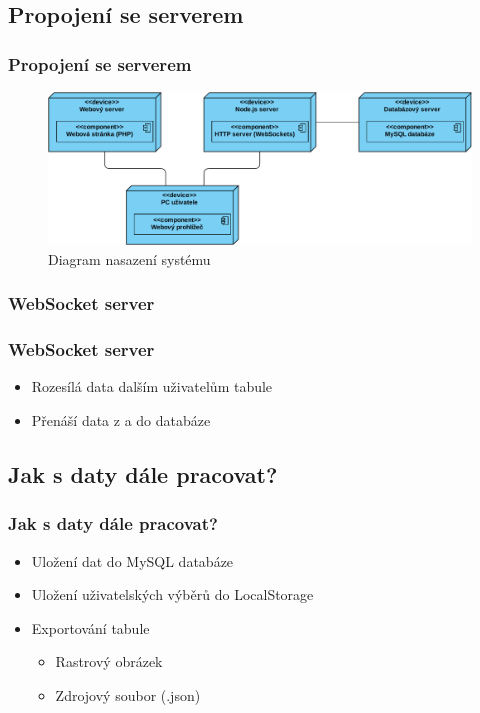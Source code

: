 \documentclass{beamer}
\begin{document}
\subsection{Propojení se serverem}
\begin{frame}
    \frametitle{Propojení se serverem}
    \begin{figure}
        \centering
        \includegraphics[width=1\textwidth]{Figures/DeploymentDiagram.pdf}
        \caption{Diagram nasazení systému}
    \end{figure}
\end{frame}

\subsubsection{WebSocket server}
\begin{frame}
    \frametitle{WebSocket server}
    \begin{itemize}
        \item Rozesílá data dalším uživatelům tabule
        \item Přenáší data z a do databáze
    \end{itemize}
\end{frame}

\subsection{Jak s daty dále pracovat?}
\begin{frame}
    \frametitle{Jak s daty dále pracovat?}
    \begin{itemize}
        \item Uložení dat do MySQL databáze
        \item Uložení uživatelských výběrů do LocalStorage
        \item Exportování tabule
        \begin{itemize}
            \item Rastrový obrázek
            \item Zdrojový soubor (.json)
        \end{itemize}
    \end{itemize}
\end{frame}
\end{document}

